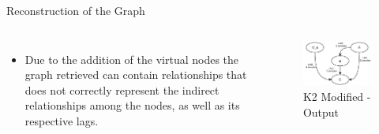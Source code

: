 \begin{frame}{Reconstruction of the Graph}
    \begin{columns}
            \begin{itemize}
                \item Due to the addition of the virtual nodes the graph retrieved can contain relationships that does not correctly represent the indirect relationships among the nodes, as well as its respective lags.
            \end{itemize}
            \begin{figure}
                \includegraphics{figuras/recGraph.pdf}
                \caption{K2 Modified - Output}
                \label{fig:my_label}
            \end{figure}
    \end{columns}
    
\end{frame}